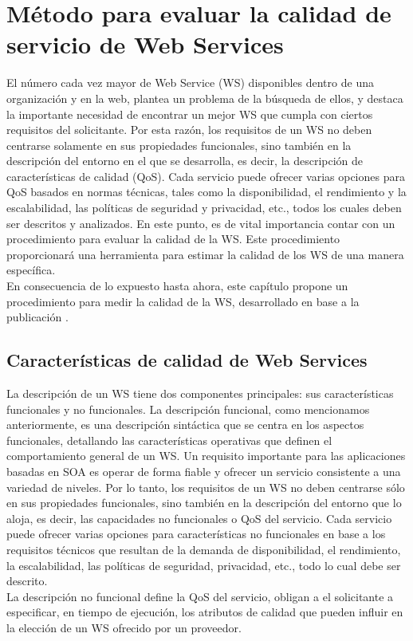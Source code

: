 \chapter{Método para evaluar la calidad de servicio de Web Services}
\label{Método para evaluar la calidad de servicio de Web Services}

El número cada vez mayor de Web Service (WS) disponibles dentro de una organización y en la web, plantea un problema de la búsqueda de ellos, y destaca la importante necesidad de encontrar un mejor WS que cumpla con ciertos requisitos del solicitante. Por esta razón, los requisitos de un WS no deben centrarse solamente en sus propiedades funcionales, sino también en la descripción del entorno en el que se desarrolla, es decir, la descripción de características de calidad (QoS). Cada servicio puede ofrecer varias opciones para QoS basados en normas técnicas, tales como la disponibilidad, el rendimiento y la escalabilidad, las políticas de seguridad y privacidad, etc., todos los cuales deben ser descritos y analizados. En este punto, es de vital importancia contar con un procedimiento para evaluar la calidad de la WS. Este procedimiento proporcionará una herramienta para estimar la calidad de los WS de una manera específica. \\
En consecuencia de lo expuesto hasta ahora, este capítulo propone un procedimiento para medir la calidad de la WS, desarrollado en base a la publicación \cite{QoS-WS-invoked}.\\

\section{Características de calidad de Web Services}
\label{Características de calidad de Web Services}

La descripción de un WS tiene dos componentes principales: sus características funcionales y no funcionales. La descripción funcional, como mencionamos anteriormente, es una descripción sintáctica que se centra en los aspectos funcionales, detallando las características operativas que definen el comportamiento general de un WS. Un requisito importante para las aplicaciones basadas en SOA es operar de forma fiable y ofrecer un servicio consistente a una variedad de niveles. Por lo tanto, los requisitos de un WS no deben centrarse sólo en sus propiedades funcionales, sino también en la descripción del entorno que lo aloja, es decir, las capacidades no funcionales o QoS del servicio. Cada servicio puede ofrecer varias opciones para características no funcionales en base a los requisitos técnicos que resultan de la demanda de disponibilidad, el rendimiento, la escalabilidad, las políticas de seguridad, privacidad, etc., todo lo cual debe ser descrito.\\
La descripción no funcional define la QoS del servicio, obligan a el solicitante a especificar, en tiempo de ejecución, los atributos de calidad que pueden influir en la elección de un WS ofrecido por un proveedor.

